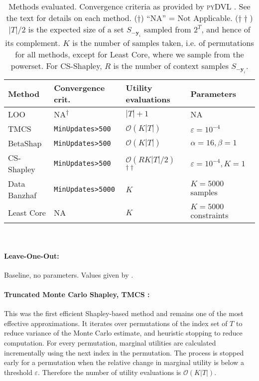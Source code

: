 \documentclass[10pt]{article}
\newcommand{\tmmathbf}[1]{\ensuremath{\boldsymbol{#1}}}
\newcommand{\tmname}[1]{\textsc{#1}}
\newcommand{\tmrsup}[1]{\textsuperscript{#1}}
\newcommand{\python}[1]{\texttt{#1}}
\begin{document}
\begin{table}[h]
  \begin{tabular}{llll}
    {\color[HTML]{000000}Method} & Convergence crit. & Utility evaluations &
    Parameters\\
    \hline
    LOO & NA\tmrsup{$\dagger$} & $|T| + 1$ & NA\\
    TMCS {\citep{ghorbani_data_2019}} & {\small {\python{MinUpdates>500}}} &
    $\mathcal{O} (K|T|)$ & $\varepsilon = 10^{- 4}$\\
    BetaShap {\citep{kwon_beta_2022}} & {\small {\python{MinUpdates>500}}} &
    $\mathcal{O} (K|T|)$ & $\alpha = 16, \beta = 1$\\
    CS-Shapley {\citep{schoch_csshapley_2022}} & {\small
    {\python{MinUpdates>500}}} & $\mathcal{O} (RK|T| / 2)$\tmrsup{$\dagger
    \dagger$} & $\varepsilon = 10^{- 4}, K = 1$\\
    Data Banzhaf {\citep{wang_data_2023}} & {\small
    {\python{MinUpdates>5000}}} & $K$ & $K = 5000$ samples\\
    Least Core {\citep{yan_if_2021}} & NA & $K$ & $K = 5000$ constraints
  \end{tabular} \
  \caption{Methods evaluated. Convergence criteria as provided by
  {\tmname{pyDVL}} {\citep{transferlab_pydvl_2022}}. See the text for
  details on each method. ($\dagger$) ``NA'' = Not Applicable. ($\dagger
  \dagger$) $|T| / 2$ is the expected size of a set $S_{-\tmmathbf{y}_i}$
  sampled from $2^T$, and hence of its complement. $K$ is the number of
  samples taken, i.e. of permutations for all methods, except for Least Core,
  where we sample from the powerset. For CS-Shapley, $R$ is the number of
  context samples $S_{-\tmmathbf{y}_i}$.}
\end{table}

\paragraph{Leave-One-Out:}Baseline, no parameters. Values given by
\Cref{eq:loo}.

\paragraph{Truncated Monte Carlo Shapley, TMCS
{\citep{ghorbani_data_2019}}:}This was the first efficient Shapley-based
method and remains one of the most effective approximations. It iterates over
permutations of the index set of $T$ to reduce variance of the Monte Carlo
estimate, and heuristic stopping to reduce computation. For every permutation,
marginal utilities are calculated incrementally using the next index in the
permutation. The process is stopped early for a permutation when the relative
change in marginal utility is below a threshold $\varepsilon$. Therefore the
number of utility evaluations is $\mathcal{O} (K | T |)$.
\end{document}
